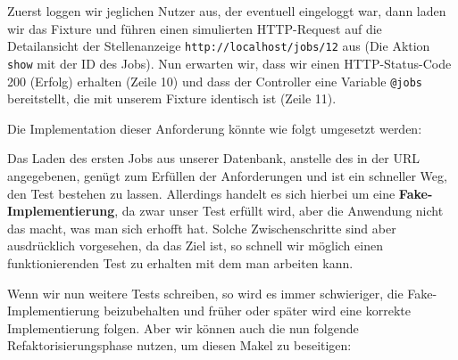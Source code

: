 \tddred
Zuerst loggen wir jeglichen Nutzer aus, der eventuell eingeloggt war, dann laden wir das Fixture und führen einen simulierten HTTP-Request auf die Detailansicht der Stellenanzeige \texttt{http://localhost/jobs/12} aus (Die Aktion \texttt{show} mit der ID des Jobs).
Nun erwarten wir, dass wir einen HTTP-Status-Code 200 (Erfolg) erhalten (Zeile 10) und dass der Controller eine Variable \texttt{@jobs} bereitstellt, die mit unserem Fixture identisch ist (Zeile 11).

Die Implementation dieser Anforderung könnte wie folgt umgesetzt werden:
%
%
\begin{ruby}[label=app/controllers/jobs\_controller.rb]
   
   
      
\end{ruby}

\tddgreen
Das Laden des ersten Jobs aus unserer Datenbank, anstelle des in der URL angegebenen, genügt zum Erfüllen der Anforderungen und ist ein schneller Weg, den Test bestehen zu lassen. Allerdings handelt es sich hierbei um eine \textbf{Fake-Implementierung}, da zwar unser Test erfüllt wird, aber die Anwendung nicht das macht, was man sich erhofft hat. Solche Zwischenschritte sind aber ausdrücklich vorgesehen, da das Ziel ist, so schnell wir möglich einen funktionierenden Test zu erhalten mit dem man arbeiten kann.

Wenn wir nun weitere Tests schreiben, so wird es immer schwieriger, die Fake\hyp{}Implementierung beizubehalten und früher oder später wird eine korrekte Implementierung folgen.
Aber wir können auch die nun folgende Refaktorisierungsphase nutzen, um diesen Makel zu beseitigen:
\tddrefactor
%
\begin{ruby}[label=app/controllers/jobs\_controller.rb]
 
    \PY{o}{[}\PY{o}{]}
\end{ruby}



